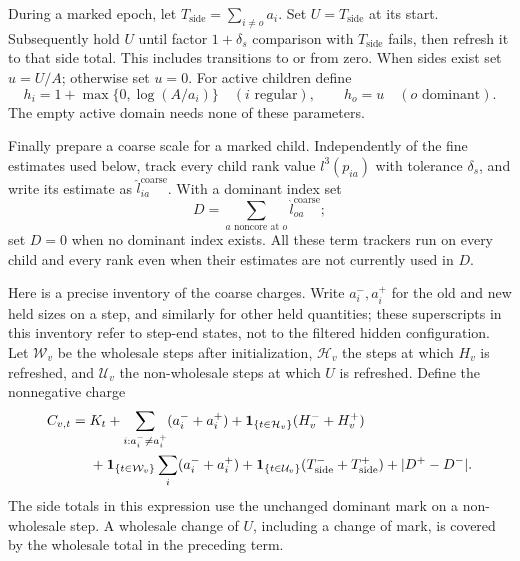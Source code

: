 During a marked epoch, let $T_{\mathrm{side}}=\sum_{i\ne o}a_i$.
Set $U=T_{\mathrm{side}}$ at its start.  Subsequently hold $U$ until
factor $1+\delta_s$ comparison with $T_{\mathrm{side}}$ fails, then
refresh it to that side total.  This includes transitions to or from zero.
When sides exist set $u=U/A$; otherwise set $u=0$.  For active children
define
\begin{equation}\label{eq:gap-weights}
 h_i=1+\max\{0,\log(A/a_i)\}\quad(i\text{ regular}),\qquad
 h_o=u\quad(o\text{ dominant}).
\end{equation}
The empty active domain needs none of these parameters.

Finally prepare a coarse scale for a marked child.  Independently of
the fine estimates used below, track every child rank value
$l^3(p_{ia})$ with tolerance $\delta_s$, and write its estimate as
$\widehat l^{\mathrm{coarse}}_{ia}$.  With a dominant index set
\begin{equation}\label{eq:dominant-scale-definition}
             D=\sum_{a\text{ noncore at }o}
                       \widehat l^{\mathrm{coarse}}_{oa};
\end{equation}
set $D=0$ when no dominant index exists.  All these term trackers run
on every child and every rank even when their estimates are not currently
used in $D$.

Here is a precise inventory of the coarse charges.  Write
$a_i^-,a_i^+$ for the old and new held sizes on a step, and similarly
for other held quantities; these superscripts in this inventory refer
to step-end states, not to the filtered hidden configuration.
Let $\mathcal W_v$ be the wholesale steps after initialization,
$\mathcal H_v$ the steps at which $H_v$ is refreshed, and
$\mathcal U_v$ the non-wholesale steps at which $U$ is refreshed.
Define the nonnegative charge
\begin{equation}\label{eq:coarse-charge-definition}
\begin{aligned}
 C_{v,t}={}&K_t+
    \sum_{i:a_i^-\ne a_i^+}(a_i^-+a_i^+)
    +\mathbf 1_{\{t\in\mathcal H_v\}}(H_v^-+H_v^+)\\
 &+\mathbf 1_{\{t\in\mathcal W_v\}}\sum_i(a_i^-+a_i^+)
    +\mathbf 1_{\{t\in\mathcal U_v\}}
                    (T_{\mathrm{side}}^-+T_{\mathrm{side}}^+)
    +|D^+-D^-|.
\end{aligned}
\end{equation}
The side totals in this expression use the unchanged dominant mark
on a non-wholesale step.  A wholesale change of $U$, including a
change of mark, is covered by the wholesale total in the preceding term.

